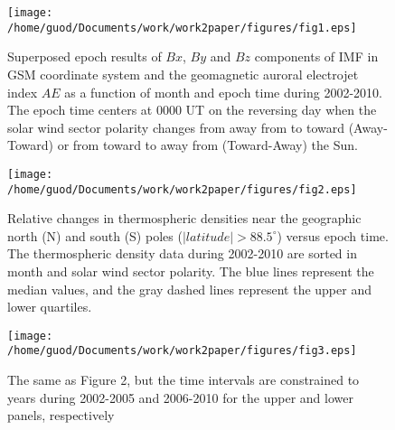 \documentclass[draft, grl]{/home/guod/Documents/template/agu_template/AGUTeX}
\begin{document}
\begin{figure}
    \centering
    \noindent\texttt{[image: 
    /home/guod/Documents/work/work2paper/figures/fig1.eps]}
    \caption{Superposed epoch results of $Bx$, $By$ and $Bz$ components of IMF 
        in GSM coordinate system and the geomagnetic auroral electrojet index
        $AE$ as a function of month and epoch time during 2002-2010. 
        The epoch time centers at 0000 UT on the reversing day when the solar 
        wind sector polarity changes from away from to toward (Away-Toward) or
        from toward to away from (Toward-Away) the Sun. }
    \label{figure1}
\end{figure}
\begin{figure}
    \centering
    \noindent\texttt{[image: 
    /home/guod/Documents/work/work2paper/figures/fig2.eps]}
    \caption{Relative changes in thermospheric densities near the geographic 
        north (N) and south (S) poles ($\left|latitude\right| > 88.5^\circ$)
        versus epoch time. The thermospheric density data during 2002-2010 are
        sorted in month and solar wind sector polarity. The blue lines 
        represent the median values, and the gray dashed lines represent the
        upper and lower quartiles.}
    \label{figure2}
\end{figure}
\begin{figure}
    \centering
    \noindent\texttt{[image: 
    /home/guod/Documents/work/work2paper/figures/fig3.eps]}
    \caption{The same as Figure 2, but the time intervals are constrained to
        years during 2002-2005 and 2006-2010 for the upper and lower panels,
        respectively}
    \label{figure3}
\end{figure}
\end{document}

